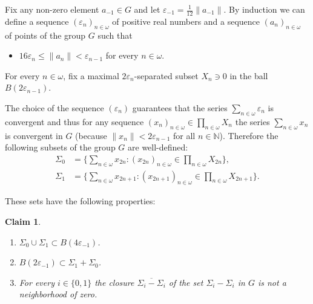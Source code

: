 \documentclass[11pt]{amsart}
\newtheorem{claim}{Claim}
\begin{document}
Fix any non-zero element $a_{-1}\in G$ and let ${\varepsilon}_{-1}=\frac1{12}\|a_{-1}\|$.
By induction we can define a sequence $({\varepsilon}_n)_{n\in{\omega}}$ of positive real numbers and a sequence $(a_n)_{n\in{\omega}}$ of points of the group $G$ such that
\begin{itemize}
\item $16{\varepsilon}_n\le \|a_n\|<{\varepsilon}_{n-1}$ for every $n\in{\omega}$.
\end{itemize}
For every $n\in{\omega}$, fix a maximal $2{\varepsilon}_n$-separated subset $X_n\ni 0$ in the ball $B(2{\varepsilon}_{n-1})$.

The choice of the  sequence $({\varepsilon}_n)$ guarantees that the series $\sum_{n\in{\omega}}{\varepsilon}_n$ is
convergent and thus for any sequence $(x_n)_{n\in{\omega}}\in \prod_{n\in{\omega}}X_n$ the
series $\sum_{n\in{\omega}}x_n$ is convergent in $G$ (because
$\|x_n\|<2{\varepsilon}_{n-1}$ for all $n\in{{\mathbb{N}}}$).
Therefore the following subsets of the group $G$ are well-defined:
$$
\begin{aligned}
\Sigma_0&=\big\{\sum_{n\in \omega}x_{2n}:(x_{2n})_{n\in{\omega}}\in\prod_{n\in{\omega}} X_{2n}\big\},\\
\Sigma_1&=\big\{\sum_{n\in \omega}x_{2n+1}:(x_{2n+1})_{n\in{\omega}}\in\prod_{n\in{\omega}}
X_{2n+1}\big\}.
\end{aligned}$$

These sets have the following properties:

\begin{claim}\label{cl1}
\begin{enumerate}
\item  $\Sigma_0\cup\Sigma_1\subset B(4{\varepsilon}_{-1})$.
\item $B(2{\varepsilon}_{-1})\subset \Sigma_1+\Sigma_0$.
\item For every $i\in\{0,1\}$ the closure $\overline{\Sigma_i-\Sigma_i}$ of the set $\Sigma_i-\Sigma_i$ in $G$ is not a neighborhood of zero.
\end{enumerate}
\end{claim}
\end{document}

